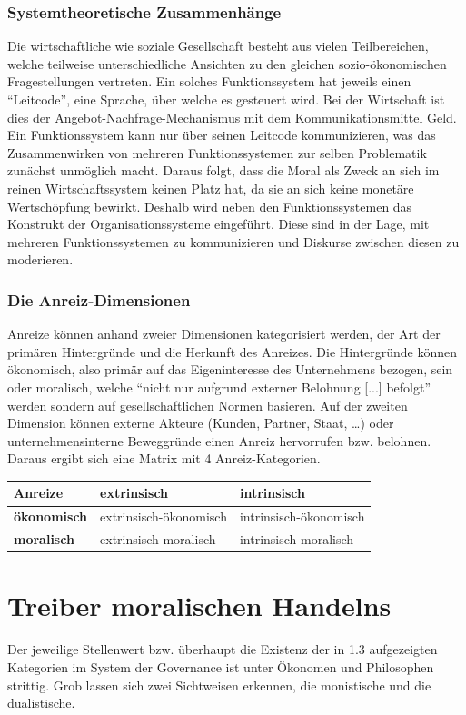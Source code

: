 \documentclass[12pt]{article}
\begin{document}
\section{Systemtheoretische Zusammenhänge}
Die wirtschaftliche wie soziale Gesellschaft besteht aus vielen Teilbereichen, welche teilweise unterschiedliche Ansichten zu den gleichen sozio-ökonomischen Fragestellungen vertreten. Ein solches Funktionssystem hat jeweils einen “Leitcode”, eine Sprache, über welche es gesteuert wird. Bei der Wirtschaft ist dies der Angebot-Nachfrage-Mechanismus mit dem Kommunikationsmittel Geld. Ein Funktionssystem kann nur über seinen Leitcode kommunizieren, was das Zusammenwirken von mehreren Funktionssystemen zur selben Problematik zunächst unmöglich macht. Daraus folgt, dass die Moral als Zweck an sich im reinen Wirtschaftssystem keinen Platz hat, da sie an sich keine monetäre Wertschöpfung bewirkt. Deshalb wird neben den Funktionssystemen das Konstrukt der Organisationssysteme eingeführt. Diese sind in der Lage, mit mehreren Funktionssystemen zu kommunizieren und Diskurse zwischen diesen zu moderieren.
\section{Die Anreiz-Dimensionen}
Anreize können anhand zweier Dimensionen kategorisiert werden, der Art der primären Hintergründe und die Herkunft des Anreizes. Die Hintergründe können ökonomisch, also primär auf das Eigeninteresse des Unternehmens bezogen, sein oder moralisch, welche “nicht nur aufgrund externer Belohnung [...] befolgt” werden sondern auf gesellschaftlichen Normen basieren. Auf der zweiten Dimension können externe Akteure (Kunden, Partner, Staat, …) oder unternehmensinterne Beweggründe einen Anreiz hervorrufen bzw. belohnen. Daraus ergibt sich eine Matrix mit 4 Anreiz-Kategorien.
\begin{center}
\begin{tabular}{|p{3cm}|p{5cm}|p{5cm}|}
\hline
Anreize & \textbf{extrinsisch} & \textbf{intrinsisch}\\\hline
\textbf{ökonomisch} & extrinsisch-ökonomisch & intrinsisch-ökonomisch\\\hline
\textbf{moralisch} & extrinsisch-moralisch & intrinsisch-moralisch\\\hline
\end{tabular}
\end{center}
\part{Treiber moralischen Handelns}
Der jeweilige Stellenwert bzw. überhaupt die Existenz der in 1.3 aufgezeigten Kategorien im System der Governance ist unter Ökonomen und Philosophen strittig. Grob lassen sich zwei Sichtweisen erkennen, die monistische und die dualistische.
\end{document}

